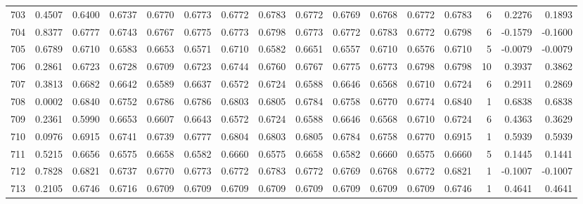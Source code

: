 \begin{tabular}{lrrrrrrrrrrrrrrr}
703 &      0.4507 &  0.6400 &  0.6737 &  0.6770 &  0.6773 &  0.6772 &  0.6783 &  0.6772 &  0.6769 &  0.6768 &   0.6772 &     0.6783 &      6 &                    0.2276 &                     0.1893 \\
704 &      0.8377 &  0.6777 &  0.6743 &  0.6767 &  0.6775 &  0.6773 &  0.6798 &  0.6773 &  0.6772 &  0.6783 &   0.6772 &     0.6798 &      6 &                   -0.1579 &                    -0.1600 \\
705 &      0.6789 &  0.6710 &  0.6583 &  0.6653 &  0.6571 &  0.6710 &  0.6582 &  0.6651 &  0.6557 &  0.6710 &   0.6576 &     0.6710 &      5 &                   -0.0079 &                    -0.0079 \\
706 &      0.2861 &  0.6723 &  0.6728 &  0.6709 &  0.6723 &  0.6744 &  0.6760 &  0.6767 &  0.6775 &  0.6773 &   0.6798 &     0.6798 &     10 &                    0.3937 &                     0.3862 \\
707 &      0.3813 &  0.6682 &  0.6642 &  0.6589 &  0.6637 &  0.6572 &  0.6724 &  0.6588 &  0.6646 &  0.6568 &   0.6710 &     0.6724 &      6 &                    0.2911 &                     0.2869 \\
708 &      0.0002 &  0.6840 &  0.6752 &  0.6786 &  0.6786 &  0.6803 &  0.6805 &  0.6784 &  0.6758 &  0.6770 &   0.6774 &     0.6840 &      1 &                    0.6838 &                     0.6838 \\
709 &      0.2361 &  0.5990 &  0.6653 &  0.6607 &  0.6643 &  0.6572 &  0.6724 &  0.6588 &  0.6646 &  0.6568 &   0.6710 &     0.6724 &      6 &                    0.4363 &                     0.3629 \\
710 &      0.0976 &  0.6915 &  0.6741 &  0.6739 &  0.6777 &  0.6804 &  0.6803 &  0.6805 &  0.6784 &  0.6758 &   0.6770 &     0.6915 &      1 &                    0.5939 &                     0.5939 \\
711 &      0.5215 &  0.6656 &  0.6575 &  0.6658 &  0.6582 &  0.6660 &  0.6575 &  0.6658 &  0.6582 &  0.6660 &   0.6575 &     0.6660 &      5 &                    0.1445 &                     0.1441 \\
712 &      0.7828 &  0.6821 &  0.6737 &  0.6770 &  0.6773 &  0.6772 &  0.6783 &  0.6772 &  0.6769 &  0.6768 &   0.6772 &     0.6821 &      1 &                   -0.1007 &                    -0.1007 \\
713 &      0.2105 &  0.6746 &  0.6716 &  0.6709 &  0.6709 &  0.6709 &  0.6709 &  0.6709 &  0.6709 &  0.6709 &   0.6709 &     0.6746 &      1 &                    0.4641 &                     0.4641 \\

\end{tabular}
